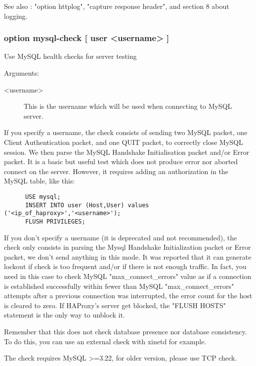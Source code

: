   See also : "option httplog", "capture response header", and section 8 about
             logging.

\subsubsection[option mysql-check]{option mysql-check [ user <username> ]}

  Use MySQL health checks for server testing


  Arguments:
\begin{description}
\item[<username>] This is the username which will be used when connecting to MySQL
               server.
\end{description}

  If you specify a username, the check consists of sending two MySQL packet,
  one Client Authentication packet, and one QUIT packet, to correctly close
  MySQL session. We then parse the MySQL Handshake Initialisation packet and/or
  Error packet. It is a basic but useful test which does not produce error nor
  aborted connect on the server. However, it requires adding an authorization
  in the MySQL table, like this:

\begin{verbatim}
      USE mysql;
      INSERT INTO user (Host,User) values ('<ip_of_haproxy>','<username>');
      FLUSH PRIVILEGES;
\end{verbatim}

  If you don't specify a username (it is deprecated and not recommended), the
  check only consists in parsing the Mysql Handshake Initialization packet or
  Error packet, we don't send anything in this mode. It was reported that it
  can generate lockout if check is too frequent and/or if there is not enough
  traffic. In fact, you need in this case to check MySQL "max\_connect\_errors"
  value as if a connection is established successfully within fewer than MySQL
  "max\_connect\_errors" attempts after a previous connection was interrupted,
  the error count for the host is cleared to zero. If HAProxy's server get
  blocked, the "FLUSH HOSTS" statement is the only way to unblock it.

  Remember that this does not check database presence nor database consistency.
  To do this, you can use an external check with xinetd for example.

  The check requires MySQL >=3.22, for older version, please use TCP check.

